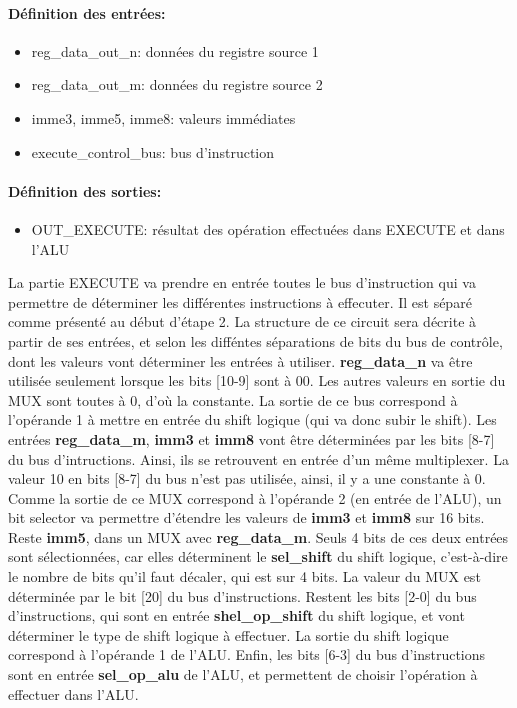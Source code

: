 \documentclass[a4paper]{article} %
\begin{document}
\paragraph{Définition des entrées:}
\begin{itemize}
    \item     reg\_data\_out\_n: données du registre source 1
    \item     reg\_data\_out\_m: données du registre source 2
    \item     imme3, imme5, imme8: valeurs immédiates
    \item     execute\_control\_bus: bus d'instruction
\end{itemize}

\paragraph{Définition des sorties:}
\begin{itemize}
    \item     OUT\_EXECUTE: résultat des opération effectuées dans EXECUTE et dans l'ALU
\end{itemize}
\medskip
La partie EXECUTE va prendre en entrée toutes le bus d'instruction qui va permettre de déterminer les différentes instructions à effecuter. Il est séparé comme présenté au début d'étape 2.
La structure de ce circuit sera décrite à partir de ses entrées, et selon les difféntes séparations de bits du bus de contrôle, dont les valeurs vont déterminer les entrées à utiliser.
\textbf{reg\_data\_n} va être utilisée seulement lorsque les bits [10-9] sont à 00. Les autres valeurs en sortie du MUX sont toutes à 0, d'où la constante. La sortie de ce bus correspond à l'opérande 1 à mettre en entrée du shift logique (qui va donc subir le shift).
Les entrées \textbf{reg\_data\_m}, \textbf{imm3} et \textbf{imm8} vont être déterminées par les bits [8-7] du bus d'intructions. Ainsi, ils se retrouvent en entrée d'un même multiplexer. La valeur 10 en bits [8-7] du bus n'est pas utilisée, ainsi, il y a une constante à 0. Comme la sortie de ce MUX correspond à l'opérande 2 (en entrée de l'ALU), un bit selector va permettre d'étendre les valeurs de \textbf{imm3} et \textbf{imm8} sur 16 bits.
Reste \textbf{imm5}, dans un MUX avec \textbf{reg\_data\_m}. Seuls 4 bits de ces deux entrées sont sélectionnées, car elles déterminent le \textbf{sel\_shift} du shift logique, c'est-à-dire le nombre de bits qu'il faut décaler, qui est sur 4 bits. La valeur du MUX est déterminée par le  bit [20] du bus d'instructions. Restent les bits [2-0] du bus d'instructions, qui sont en entrée  \textbf{shel\_op\_shift} du shift logique, et vont déterminer le type de shift logique à effectuer. La sortie du shift logique correspond à l'opérande 1 de l'ALU. Enfin, les bits [6-3] du bus d'instructions sont en entrée \textbf{sel\_op\_alu} de l'ALU, et permettent de choisir l'opération à effectuer dans l'ALU.
\end{document}
